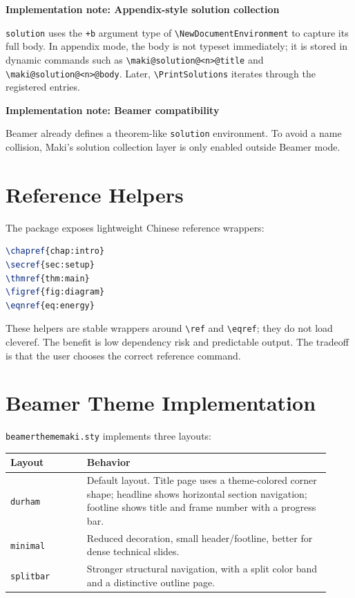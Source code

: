 \documentclass[a4paper,11pt]{ltxdoc}
\newcommand{\mfile}[1]{\texttt{#1}}
\newcommand{\mpkg}[1]{\textsf{#1}}
\newcommand{\mopt}[1]{\texttt{#1}}
\newcommand{\menv}[1]{\texttt{#1}}
\newcommand{\mcmd}[1]{\texttt{\textbackslash#1}}
\newenvironment{implementation}[1]
  {\par\medskip\noindent\textbf{\color{MakiBlue}Implementation note: #1}\par\smallskip}
  {\par\medskip}
\begin{document}
\begin{implementation}{Appendix-style solution collection}
\menv{solution} uses the \verb|+b| argument type of \mcmd{NewDocumentEnvironment}
to capture its full body. In appendix mode, the body is not typeset immediately;
it is stored in dynamic commands such as
\verb|\maki@solution@<n>@title| and \verb|\maki@solution@<n>@body|. Later,
\mcmd{PrintSolutions} iterates through the registered entries.
\end{implementation}

\begin{implementation}{Beamer compatibility}
Beamer already defines a theorem-like \menv{solution} environment. To avoid a
name collision, Maki's solution collection layer is only enabled outside Beamer
mode.
\end{implementation}

\section{Reference Helpers}

The package exposes lightweight Chinese reference wrappers:

\begin{lstlisting}[language=TeX]
\chapref{chap:intro}
\secref{sec:setup}
\thmref{thm:main}
\figref{fig:diagram}
\eqnref{eq:energy}
\end{lstlisting}

These helpers are stable wrappers around \mcmd{ref} and \mcmd{eqref}; they do not
load \mpkg{cleveref}. The benefit is low dependency risk and predictable output.
The tradeoff is that the user chooses the correct reference command.

\section{Beamer Theme Implementation}

\mfile{beamerthememaki.sty} implements three layouts:

\begin{longtable}{@{}p{0.22\linewidth}p{0.7\linewidth}@{}}
\toprule
Layout & Behavior \\
\midrule
\mopt{durham} & Default layout. Title page uses a theme-colored corner shape; headline shows horizontal section navigation; footline shows title and frame number with a progress bar.\\
\mopt{minimal} & Reduced decoration, small header/footline, better for dense technical slides.\\
\mopt{splitbar} & Stronger structural navigation, with a split color band and a distinctive outline page.\\
\bottomrule
\end{longtable}
\end{document}
